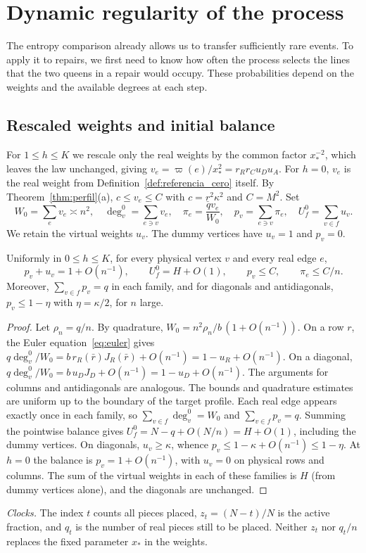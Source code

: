 \section{Dynamic regularity of the process}\label{sec:regularidad}

The entropy comparison already allows us to transfer sufficiently rare events. To apply it to repairs, we
first need to know how often
the process selects the lines that the two queens in a repair would occupy. These probabilities depend on
the weights and the available
degrees at each step.

\subsection{Rescaled weights and initial balance}

For $1\le h\le K$ we rescale only the real weights by the common factor $x_*^{-2}$, which leaves the law
unchanged, giving
$v_e=\varpi(e)/x_*^2=r_Rr_Cu_Du_A$. For $h=0$, $v_e$ is the real weight from
Definition~\ref{def:referencia_cero} itself. By
Theorem~\ref{thm:perfil}(a), $c\le v_e\le C$ with $c=\underline r^2\kappa^2$ and $C=M^2$. Set \[
 W_0=\sum_ev_e\asymp n^2,\quad \deg_v^0=\sum_{e\ni v}v_e,\quad \pi_e=\frac{qv_e}{W_0},\quad
 p_v=\sum_{e\ni v}\pi_e,\quad U_f^0=\sum_{v\in f}u_v .
\] We retain the virtual weights $u_v$. The dummy vertices have $u_v=1$ and $p_v=0$.

\begin{lema}\label{lem:balance} Uniformly in $0\le h\le K$, for every physical vertex $v$
and every real edge $e$,
\begin{equation}\label{eq:balance}
 p_v+u_v=1+O(n^{-1}),\qquad U_f^0=H+O(1),\qquad p_v\le C,\qquad \pi_e\le C/n .
\end{equation} Moreover, $\sum_{v\in f}p_v=q$ in each family, and for diagonals and antidiagonals,
$p_v\le1-\eta$ with $\eta=\kappa/2$,
for $n$ large. \end{lema}

\begin{proof} Let $\rho_n=q/n$. By quadrature, $W_0=n^2\rho_n/b\,(1+O(n^{-1}))$. On a row $r$, the Euler
equation~\eqref{eq:euler} gives
$q\deg_v^0/W_0=b\,r_R(\bar r)J_R(\bar r)+O(n^{-1})=1-u_R+O(n^{-1})$. On a diagonal,
$q\deg_v^0/W_0=b\,u_DJ_D+O(n^{-1})=1-u_D+O(n^{-1})$. The arguments for columns and antidiagonals are
analogous. The bounds and
quadrature estimates are uniform up to the boundary of the target profile. Each real edge appears exactly
once in each family, so
$\sum_{v\in f}\deg_v^0=W_0$ and $\sum_{v\in f}p_v=q$. Summing the pointwise balance gives
$U_f^0=N-q+O(N/n)=H+O(1)$, including the
dummy vertices. On diagonals, $u_v\ge\kappa$, whence $p_v\le1-\kappa+O(n^{-1})\le1-\eta$. At $h=0$ the
balance is $p_v=1+O(n^{-1})$,
with $u_v=0$ on physical rows and columns. The sum of the virtual weights in each of these families is $H$
(from dummy vertices alone),
and the diagonals are unchanged. \end{proof}

\emph{Clocks.} The index $t$ counts all pieces placed, $z_t=(N-t)/N$ is the active fraction, and $q_t$ is
the number of real pieces still to be
placed. Neither $z_t$ nor $q_t/n$ replaces the fixed parameter $x_*$ in the weights.
